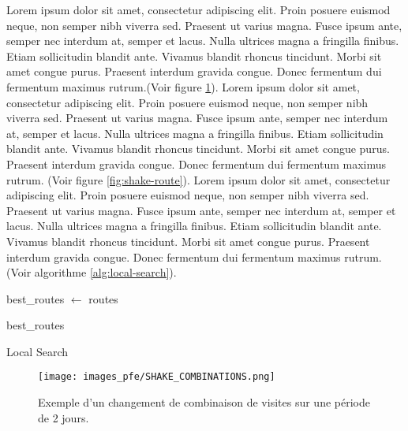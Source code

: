 \medskip

Lorem ipsum dolor sit amet, consectetur adipiscing elit. Proin posuere euismod neque, non semper nibh viverra sed. Praesent ut varius magna. Fusce ipsum ante, semper nec interdum at, semper et lacus. Nulla ultrices magna a fringilla finibus. Etiam sollicitudin blandit ante. Vivamus blandit rhoncus tincidunt. Morbi sit amet congue purus. Praesent interdum gravida congue. Donec fermentum dui fermentum maximus rutrum.(Voir figure \ref{fig:shake-combinations}). Lorem ipsum dolor sit amet, consectetur adipiscing elit. Proin posuere euismod neque, non semper nibh viverra sed. Praesent ut varius magna. Fusce ipsum ante, semper nec interdum at, semper et lacus. Nulla ultrices magna a fringilla finibus. Etiam sollicitudin blandit ante. Vivamus blandit rhoncus tincidunt. Morbi sit amet congue purus. Praesent interdum gravida congue. Donec fermentum dui fermentum maximus rutrum. (Voir figure \ref{fig:shake-route}). Lorem ipsum dolor sit amet, consectetur adipiscing elit. Proin posuere euismod neque, non semper nibh viverra sed. Praesent ut varius magna. Fusce ipsum ante, semper nec interdum at, semper et lacus. Nulla ultrices magna a fringilla finibus. Etiam sollicitudin blandit ante. Vivamus blandit rhoncus tincidunt. Morbi sit amet congue purus. Praesent interdum gravida congue. Donec fermentum dui fermentum maximus rutrum. (Voir algorithme \ref{alg:local-search}).

\medskip

\begin{algorithm}[H]
  best\_routes $\gets$ routes \;
  
  \Return best\_routes \;
  \caption{Local Search}
  \label{alg:local-search}
\end{algorithm}
\FloatBarrier

\medskip

\begin{figure}[hbt!]
  \centering
  \texttt{[image: images\_pfe/SHAKE\_COMBINATIONS.png]}
  \caption{Exemple d'un changement de combinaison de visites sur une période de 2 jours.}
  \label{fig:shake-combinations}
\end{figure}
\FloatBarrier

